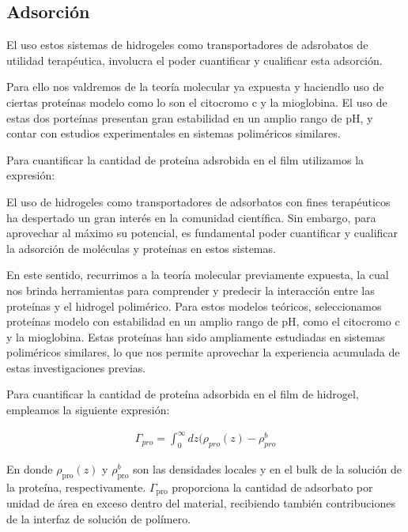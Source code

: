 \subsection{Adsorci\'on}\label{sec:film:resu-absorcion}

El uso estos sistemas de hidrogeles como transportadores de adsrobatos de utilidad terap\'eutica, involucra el poder cuantificar y cualificar esta adsorci\'on.
 
Para ello nos valdremos de la teor\'ia molecular ya expuesta y haciendlo uso de ciertas prote\'inas modelo como lo son el citocromo c y la mioglobina. El uso de estas dos porte\'inas presentan gran estabilidad en un amplio rango de pH, y contar con estudios experimentales en sistemas polim\'ericos similares.

Para cuantificar la cantidad de prote\'ina adsrobida en el film utilizamos la expresi\'on:


El uso de hidrogeles como transportadores de adsorbatos con fines terap\'euticos ha despertado un gran inter\'es en la comunidad cient\'ifica. Sin embargo, para aprovechar al m\'aximo su potencial, es fundamental poder cuantificar y cualificar la adsorci\'on de mol\'eculas y prote\'inas en estos sistemas.

En este sentido, recurrimos a la teor\'ia molecular previamente expuesta, la cual nos brinda herramientas para comprender y predecir la interacci\'on entre las prote\'inas y el hidrogel polim\'erico. Para estos  modelos te\'oricos, seleccionamos prote\'inas modelo con estabilidad en un amplio rango de pH, como el citocromo c y la mioglobina. Estas prote\'inas han sido ampliamente estudiadas en sistemas polim\'ericos similares, lo que nos permite aprovechar la experiencia acumulada de estas investigaciones previas.

Para cuantificar la cantidad de prote\'ina adsorbida en el film de hidrogel, empleamos la siguiente  expresi\'on:

\begin{align}
\Gamma_{pro} = \int^\infty_0 {dz(\rho_{pro}(z) -\rho^b_{pro}}  
\label{eq:film:adsor-exceso}
\end{align}


En donde $\rho_{\text{pro}}(z)$ y $\rho^b_{\text{pro}}$ son las densidades locales y en el bulk de la soluci\'on de la prote\'ina, respectivamente.
$\Gamma_{\text{pro}}$ proporciona la cantidad de adsorbato por unidad de \'area en exceso dentro del material, recibiendo tambi\'en contribuciones de la interfaz de soluci\'on de pol\'imero.

